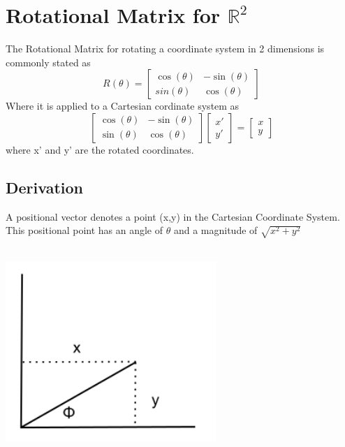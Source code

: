 
\section{Rotational Matrix for $\mathbb{R}^2$}
The Rotational Matrix for rotating a coordinate system in 2 dimensions is commonly stated as
\[
R(\theta) = \left[ \begin{matrix}
\cos(\theta) & -\sin(\theta) \\
sin(\theta) &  \cos(\theta) 
\end{matrix}\right]
\]
Where it is applied to a Cartesian cordinate system as
\[
\left[ \begin{matrix}
\cos(\theta) & -\sin(\theta) \\
\sin(\theta) &  \cos(\theta) 
\end{matrix}\right] 
\left[ \begin{matrix}
x' \\
y'
\end{matrix} \right] =
\left[ \begin{matrix}
x \\
y
\end{matrix} \right]
\]
where x' and y' are the rotated coordinates.

\subsection{Derivation}
A positional vector denotes a point (x,y) in the Cartesian Coordinate System.  This positional point has an angle of \(\theta\) and a magnitude of \(\sqrt{x^2 + y^2}\) \\
\\
\begin{center}
\includegraphics[width=8cm]{Linear_Algebra/rotational_matrix_diag1}
\end{center}

